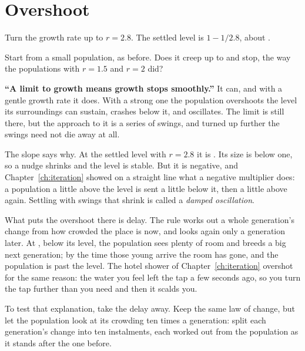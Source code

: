 \section{Overshoot}
\label{sec:ch03-overshoot}

\noindent
Turn the growth rate up to $r = \num{2.8}$. The settled level is
$1 - 1/\num{2.8}$, about .

\begin{think}
Start from a small population, as before. Does it creep up to
 and stop, the way the populations with
$r = \num{1.5}$ and $r = 2$ did?
\end{think}

\begin{trapbox}
\textbf{\enquote{A limit to growth means growth stops smoothly.}} It can,
and with a gentle growth rate it does. With a strong one the population
overshoots the level its surroundings can sustain, crashes below it, and
oscillates. The limit is still there, but the approach to it is a series of
swings, and turned up further the swings need not die away at all.
\end{trapbox}

\noindent
The slope says why. At the settled level with $r = \num{2.8}$ it is
. Its size is below one, so a nudge shrinks and the
level is stable. But it is negative, and Chapter~\ref{ch:iteration} showed
on a straight line what a negative multiplier does: a population a little
above the level is sent a little below it, then a little above again.
Settling with swings that shrink is called a \emph{damped oscillation}.

What puts the overshoot there is delay. The rule works out a whole
generation's change from how crowded the place is now, and looks again only a
generation later. At , below its level, the population
sees plenty of room and breeds a big next generation; by the time those
young arrive the room has gone, and the population is past the level. The
hotel shower of Chapter~\ref{ch:iteration} overshot for the same reason: the
water you feel left the tap a few seconds ago, so you turn the tap further
than you need \dash{} and then it scalds you.

To test that explanation, take the delay away. Keep the same law of change,
but let the population look at its crowding ten times a generation: split
each generation's change into ten instalments, each worked out from the
population as it stands after the one before.

